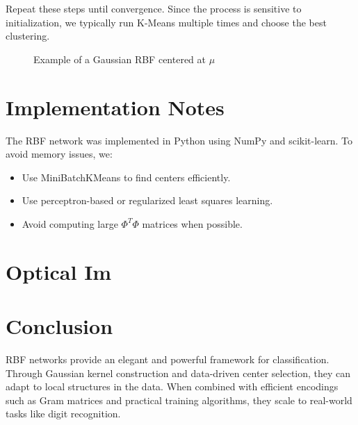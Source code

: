 \documentclass[twocolumn]{article} %
\begin{document}
Repeat these steps until convergence. Since the process is sensitive to initialization, we typically run K-Means multiple times and choose the best clustering.

\begin{figure}[h!]
    \centering
    
    \caption{Example of a Gaussian RBF centered at $\mu$}
    \label{fig:gaussian_rbf}
\end{figure} 

\section{Implementation Notes}
The RBF network was implemented in Python using NumPy and scikit-learn. To avoid memory issues, we:
\begin{itemize}
    \item Use MiniBatchKMeans to find centers efficiently.
    \item Use perceptron-based or regularized least squares learning.
    \item Avoid computing large $\Phi^T\Phi$ matrices when possible.
\end{itemize}

\section{Optical Im}

\section{Conclusion}
RBF networks provide an elegant and powerful framework for classification. Through Gaussian kernel construction and data-driven center selection, they can adapt to local structures in the data. When combined with efficient encodings such as Gram matrices and practical training algorithms, they scale to real-world tasks like digit recognition.

{}

\end{document}
